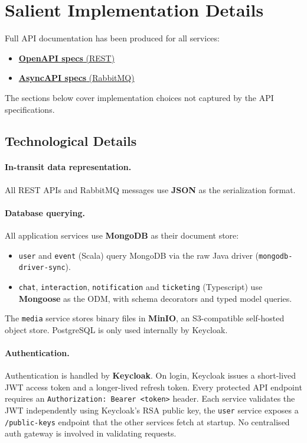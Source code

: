 \section{Salient Implementation Details}

Full API documentation has been produced for all services:
\begin{itemize}
  \item \href{https://eventonight.github.io/EvenToNight/openAPI/}{\textbf{OpenAPI specs} (REST)}
  \item \href{https://eventonight.github.io/EvenToNight/asyncAPI/}{\textbf{AsyncAPI specs} (RabbitMQ)}
\end{itemize}

The sections below cover implementation choices not captured by the API specifications.

\subsection{Technological Details}

\paragraph{In-transit data representation.} All REST APIs and RabbitMQ messages use \textbf{JSON} as the serialization format.

\paragraph{Database querying.} All application services use \textbf{MongoDB} as their document store:

\begin{itemize}
  \item \texttt{user} and \texttt{event} (Scala) query MongoDB via the raw Java driver (\texttt{mongodb-driver-sync}).
  \item \texttt{chat}, \texttt{interaction}, \texttt{notification} and \texttt{ticketing} (Typescript) use \textbf{Mongoose} as the ODM, with schema decorators and typed model queries.
\end{itemize}

The \texttt{media} service stores binary files in \textbf{MinIO}, an S3-compatible self-hosted object store. PostgreSQL is only used internally by Keycloak.

\paragraph{Authentication.} Authentication is handled by \textbf{Keycloak}. On login, Keycloak issues a short-lived JWT access token and a longer-lived refresh token. Every protected API endpoint requires an \texttt{Authorization: Bearer <token>} header. Each service validates the JWT independently using Keycloak's RSA public key, the \texttt{user} service exposes a \texttt{/public-keys} endpoint that the other services fetch at startup. No centralised auth gateway is involved in validating requests.

